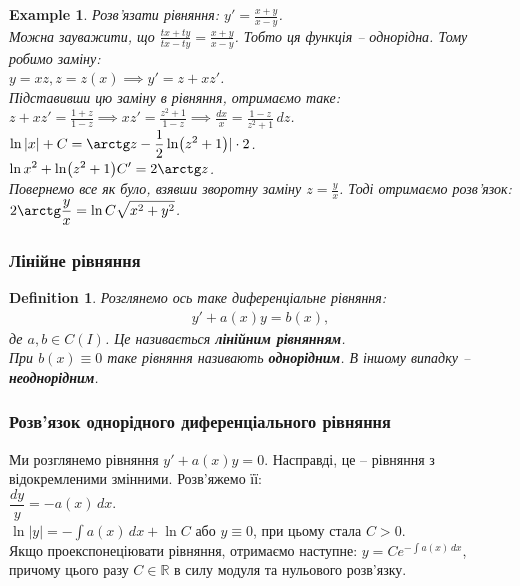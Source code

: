 \documentclass[a4paper, 10pt]{article}
\theoremstyle{theoremdd}
\theoremstyle{theoremdd}
\newtheorem{definition}[theorem]{Definition}
\theoremstyle{theoremdd}
\theoremstyle{theoremdd}
\newtheorem{example}[theorem]{Example}
\theoremstyle{theoremdd}
\theoremstyle{theoremdd}
\theoremstyle{theoremdd}
\theoremstyle{theoremdd}
\begin{document}
	\begin{example}
 	Розв'язати рівняння: $\displaystyle y' = \frac{x+y}{x-y}$.\\
	Можна зауважити, що $\displaystyle \frac{tx+ty}{tx-ty} = \frac{x+y}{x-y}$. Тобто ця функція -- однорідна. Тому робимо заміну:\\
	$y = xz, z=z(x) \implies y' = z + xz'$.\\
	Підставивши цю заміну в рівняння, отримаємо таке:\\
	$\displaystyle z+xz'=\frac{1+z}{1-z} \implies xz'=\frac{z^2+1}{1-z} \implies \frac{dx}{x} = \frac{1-z}{z^2+1} \,dz$.\\
	$\displaystyle \ln |x| + C = \arctg z - \frac{1}{2} \ln (z^2+1) |\cdot 2$.\\
	$\displaystyle \ln x^2 + \ln (z^2+1) C' = 2 \arctg z$.\\
	Повернемо все як було, взявши зворотну заміну $\displaystyle z = \frac{y}{x}$. Тоді отримаємо розв'язок:\\
	$\displaystyle 2 \arctg \frac{y}{x} = \ln C\sqrt{x^2+y^2}$.
	\end{example}

	
	\subsubsection{Лінійне рівняння}
	\begin{definition}
	Розглянемо ось таке диференціальне рівняння:
	\begin{align*}
	y' + a(x)y = b(x),
	\end{align*}
	де $a,b \in C(I)$. Це називається \textbf{лінійним рівнянням}.\\
	При $b(x) \equiv 0$ таке рівняння називають \textbf{однорідним}. В іншому випадку -- \textbf{неоднорідним}.
	\end{definition}
	
	\subsubsection*{Розв'язок однорідного диференціального рівняння}
	Ми розглянемо рівняння $y' + a(x) y = 0$. Насправді, це -- рівняння з відокремленими змінними. Розв'яжемо її:\\
	$\dfrac{dy}{y} = -a(x) \,dx$.\\
	$\ln |y| = -\displaystyle\int a(x)\,dx + \ln C$ або $y \equiv 0$, при цьому стала $C > 0$.\\
	Якщо проекспонеціювати рівняння, отримаємо наступне: $y = C e^{-\int a(x)\,dx}$, причому цього разу $C \in \mathbb{R}$ в силу модуля та нульового розв'язку.
	
\end{document}
